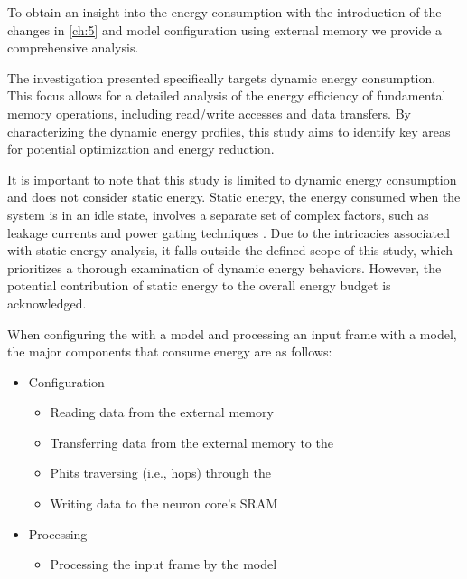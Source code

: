 To obtain an insight into the energy consumption with the introduction of the \confignoc{} changes in \cref{ch:5} and model configuration using external memory we provide a comprehensive analysis.

The investigation presented specifically targets dynamic energy consumption.
This focus allows for a detailed analysis of the energy efficiency of fundamental memory operations, including read/write accesses and data transfers.
By characterizing the dynamic energy profiles, this study aims to identify key areas for potential optimization and energy reduction.

It is important to note that this study is limited to dynamic energy consumption and does not consider static energy.
Static energy, the energy consumed when the system is in an idle state, involves a separate set of complex factors, such as leakage currents and power gating techniques \cite{haj-yahyaStaticPowerModeling2018}.
Due to the intricacies associated with static energy analysis, it falls outside the defined scope of this study, which prioritizes a thorough examination of dynamic energy behaviors.
However, the potential contribution of static energy to the overall energy budget is acknowledged.


When configuring the \graicore{} with a model and processing an input frame with a model, the major components that consume energy are as follows:
\begin{itemize}
    \item Configuration
    \begin{itemize}
        \item Reading data from the external memory
        \item Transferring data from the external memory to the \confignoc{}
        \item Phits traversing (i.e., hops) through the \confignoc{}
        \item Writing data to the neuron core's SRAM
    \end{itemize}
    \item Processing
    \begin{itemize}
        \item Processing the input frame by the model
    \end{itemize}
\end{itemize}
